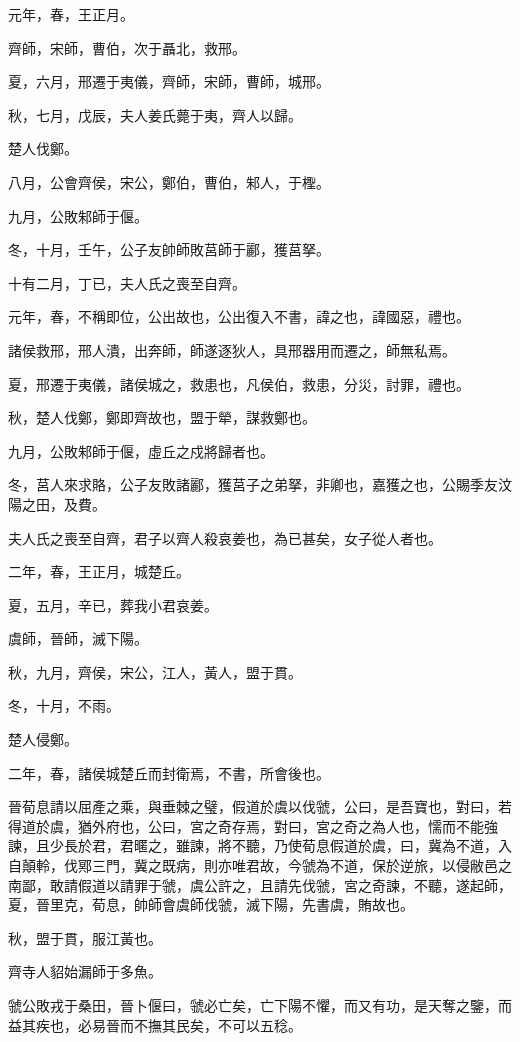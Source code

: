 
\begin{pinyinscope}
元年，春，王正月。

齊師，宋師，曹伯，次于聶北，救邢。

夏，六月，邢遷于夷儀，齊師，宋師，曹師，城邢。

秋，七月，戊辰，夫人姜氏薨于夷，齊人以歸。

楚人伐鄭。

八月，公會齊侯，宋公，鄭伯，曹伯，邾人，于檉。

九月，公敗邾師于偃。

冬，十月，壬午，公子友帥師敗莒師于酈，獲莒拏。

十有二月，丁已，夫人氏之喪至自齊。

元年，春，不稱即位，公出故也，公出復入不書，諱之也，諱國惡，禮也。

諸侯救邢，邢人潰，出奔師，師遂逐狄人，具邢器用而遷之，師無私焉。

夏，邢遷于夷儀，諸侯城之，救患也，凡侯伯，救患，分災，討罪，禮也。

秋，楚人伐鄭，鄭即齊故也，盟于犖，謀救鄭也。

九月，公敗邾師于偃，虛丘之戍將歸者也。

冬，莒人來求賂，公子友敗諸酈，獲莒子之弟拏，非卿也，嘉獲之也，公賜季友汶陽之田，及費。

夫人氏之喪至自齊，君子以齊人殺哀姜也，為已甚矣，女子從人者也。

二年，春，王正月，城楚丘。

夏，五月，辛已，葬我小君哀姜。

虞師，晉師，滅下陽。

秋，九月，齊侯，宋公，江人，黃人，盟于貫。

冬，十月，不雨。

楚人侵鄭。

二年，春，諸侯城楚丘而封衛焉，不書，所會後也。

晉荀息請以屈產之乘，與垂棘之璧，假道於虞以伐虢，公曰，是吾寶也，對曰，若得道於虞，猶外府也，公曰，宮之奇存焉，對曰，宮之奇之為人也，懦而不能強諫，且少長於君，君暱之，雖諫，將不聽，乃使荀息假道於虞，曰，冀為不道，入自顛軨，伐鄍三門，冀之既病，則亦唯君故，今虢為不道，保於逆旅，以侵敝邑之南鄙，敢請假道以請罪于虢，虞公許之，且請先伐虢，宮之奇諫，不聽，遂起師，夏，晉里克，荀息，帥師會虞師伐虢，滅下陽，先書虞，賄故也。

秋，盟于貫，服江黃也。

齊寺人貂始漏師于多魚。

虢公敗戎于桑田，晉卜偃曰，虢必亡矣，亡下陽不懼，而又有功，是天奪之鑒，而益其疾也，必易晉而不撫其民矣，不可以五稔。


\end{pinyinscope}
